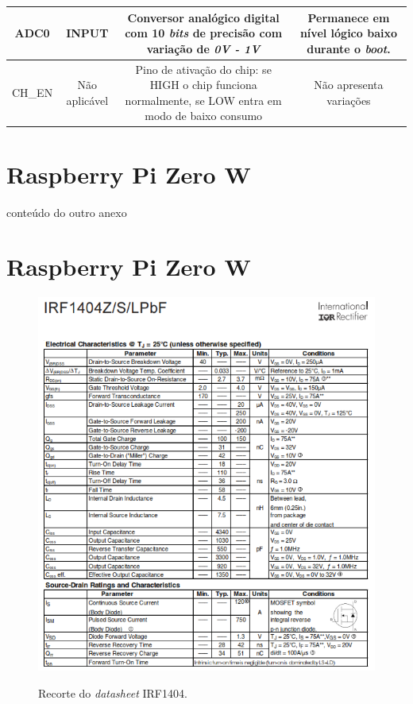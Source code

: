 \begin{anexosenv}
\begin{center}
\begin{longtable}{c|c|c|c}
		ADC0 & INPUT & \multicolumn{1}{m{5cm}|}{Conversor analógico digital com 10 \textit{bits} de precisão com variação de \textit{0V - 1V}} & \multicolumn{1}{m{4cm}}{Permanece em nível lógico baixo durante o \textit{boot}.}\\ \hline
		
		 CH\_EN & Não aplicável & \multicolumn{1}{m{5cm}|}{Pino de ativação do chip: se HIGH o chip funciona normalmente, se LOW entra em modo de baixo consumo} & \multicolumn{1}{m{4cm}}{Não apresenta variações}\\ \hline
	
	\end{longtable}
	
\end{center}


\chapter{Raspberry Pi Zero W}
\label{chap:anexoB}

conteúdo do outro anexo


\chapter{Raspberry Pi Zero W}
\label{chap:anexoC}


\begin{figure}[H]
	\centering
	\caption{Recorte do \textit{datasheet} IRF1404.}
	\includegraphics[width=1\textwidth]{figuras/datasheet_irf.png}
	\label{fig:datasheet_irf}
\end{figure}

\end{anexosenv}